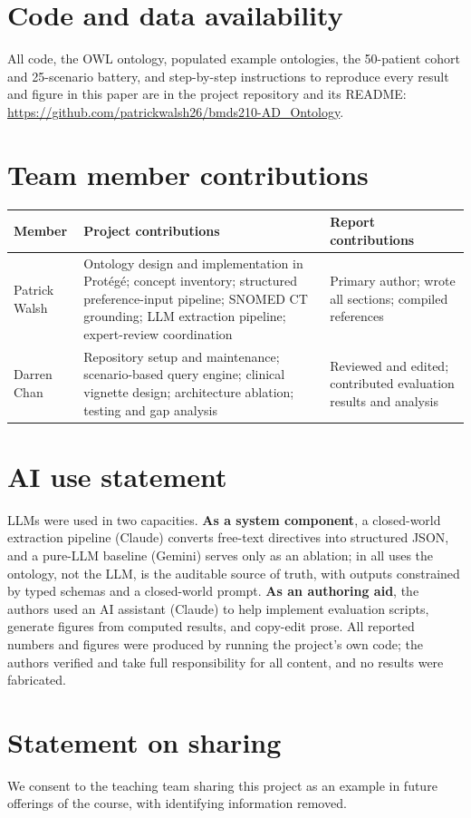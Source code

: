 \documentclass[10pt]{article}
\begin{document}
\section{Code and data availability}
All code, the OWL ontology, populated example ontologies, the 50-patient cohort and 25-scenario battery, and step-by-step instructions to reproduce every result and figure in this paper are in the project repository and its README: \url{https://github.com/patrickwalsh26/bmds210-AD_Ontology}.

\section{Team member contributions}
\begin{table}[ht]
\centering
\small
\begin{tabularx}{\textwidth}{lXX}
\toprule
\textbf{Member} & \textbf{Project contributions} & \textbf{Report contributions} \\
\midrule
Patrick Walsh & Ontology design and implementation in Prot\'eg\'e; concept inventory; structured preference-input pipeline; SNOMED CT grounding; LLM extraction pipeline; expert-review coordination & Primary author; wrote all sections; compiled references \\[4pt]
Darren Chan & Repository setup and maintenance; scenario-based query engine; clinical vignette design; architecture ablation; testing and gap analysis & Reviewed and edited; contributed evaluation results and analysis \\
\bottomrule
\end{tabularx}
\end{table}

\section{AI use statement}
LLMs were used in two capacities. \textbf{As a system component}, a closed-world extraction pipeline (Claude) converts free-text directives into structured JSON, and a pure-LLM baseline (Gemini) serves only as an ablation; in all uses the ontology, not the LLM, is the auditable source of truth, with outputs constrained by typed schemas and a closed-world prompt. \textbf{As an authoring aid}, the authors used an AI assistant (Claude) to help implement evaluation scripts, generate figures from computed results, and copy-edit prose. All reported numbers and figures were produced by running the project's own code; the authors verified and take full responsibility for all content, and no results were fabricated.

\section{Statement on sharing}
We consent to the teaching team sharing this project as an example in future offerings of the course, with identifying information removed.
\end{document}
